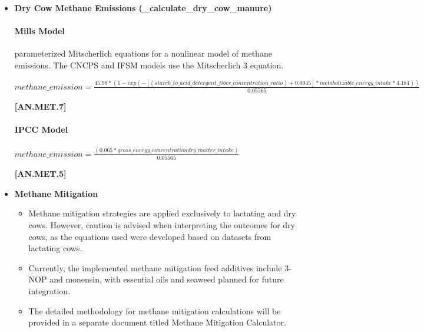 \documentclass{article}
\begin{document}
\begin{refsection}
\begin{itemize}
            {\raggedleft \textbf{[AN.MET.5]}\par}
            \vspace{0.5cm}

        \item \textbf{Dry Cow Methane Emissions (\_calculate\_dry\_cow\_manure)}

\paragraph{Mills Model}
\vspace{-0.25cm}

\cite{Mills2003} parameterized Mitscherlich equations for a nonlinear model of methane emissions. The CNCPS and IFSM models use the Mitscherlich 3 equation.
\vspace{0.2cm}

    \begin{center}
        \(methane\_emission=\frac{45.98 * (1 - exp(-[(starch\_to\_acid\_detergent\_fiber\_concentration\_ratio) + 0.0045] *metabolizable\_energy\_intake * 4.184))}{0.05565}\)
    \end{center}
        \vspace{0.5cm} 
    
            {\raggedleft \textbf{[AN.MET.7]}\par}
            \vspace{0.5cm}

\paragraph{IPCC Model}\nocite{Niu2018}
\vspace{-0.25cm}

    \begin{center}
        \(methane\_emission = \frac{(0.065 * gross\_energy\_concentration dry\_matter\_intake)}{0.05565}\)
    \end{center}
        \vspace{0.5cm} 
    
            {\raggedleft \textbf{[AN.MET.5]}\par}
            \vspace{0.5cm}

        \item \textbf{Methane Mitigation}
        \begin{itemize}
            \item Methane mitigation strategies are applied exclusively to lactating and dry cows. However, caution is advised when interpreting the outcomes for dry cows, as the equations used were developed based on datasets from lactating cows.
            \item Currently, the implemented methane mitigation feed additives include 3-NOP and monensin, with essential oils and seaweed planned for future integration.
            \item The detailed methodology for methane mitigation calculations will be provided in a separate document titled Methane Mitigation Calculator.
        \end{itemize}
    \end{itemize}


\end{refsection}
\end{document}
